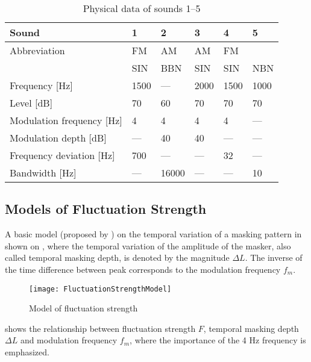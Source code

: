 \documentclass[../main.tex]{subfiles}
\begin{document}
\begin{theoreticalbackground}
\begin{table}
    \centering
    \begin{tabu} to \linewidth{ lXXXXX }
        \toprule
        Sound & 1 & 2 & 3 & 4 & 5 \\
        \midrule
        Abbreviation & FM & AM & AM & FM & \\
        & SIN & BBN & SIN & SIN & NBN \\
        Frequency [Hz] & 1500 & --- & 2000 & 1500 & 1000 \\
        Level [dB] & 70 & 60 & 70 & 70 & 70 \\
        Modulation frequency [Hz] & 4 & 4 & 4 & 4 & --- \\
        Modulation depth [dB] & --- & 40 & 40 & --- & --- \\
        Frequency deviation [Hz] & 700 & --- & --- & 32 & --- \\
        Bandwidth [Hz] & --- & 16000 & --- & --- & 10 \\
        \bottomrule
    \end{tabu}
    \caption{Physical data of sounds 1--5
        \cite[pp. 253]{Fastl2007Psychoacoustics}}
    \label{tab:flucstrensnds}
\end{table}

\subsection{Models of Fluctuation Strength}

A basic model (proposed by \citeauthor{Fastl2007Psychoacoustics}
\cite[pp.~254]{Fastl2007Psychoacoustics}) on the temporal variation of a masking
pattern in shown on , where the temporal variation of
the amplitude of the masker, also called temporal masking depth, is denoted by
the magnitude $\Delta L$. The inverse of the time difference between peak
corresponds to the modulation frequency $f_{m}$.

\begin{figure}
    \centering
    \texttt{[image: FluctuationStrengthModel]}
    \caption{Model of fluctuation strength
        \cite[pp. 254]{Fastl2007Psychoacoustics}}
    \label{fig:flucstrenmodel}
\end{figure}

 shows the relationship between fluctuation
strength $F$, temporal masking depth $\Delta L$ and modulation frequency
$f_{m}$, where the importance of the 4 Hz frequency is emphasized.


\end{theoreticalbackground}
\end{document}
